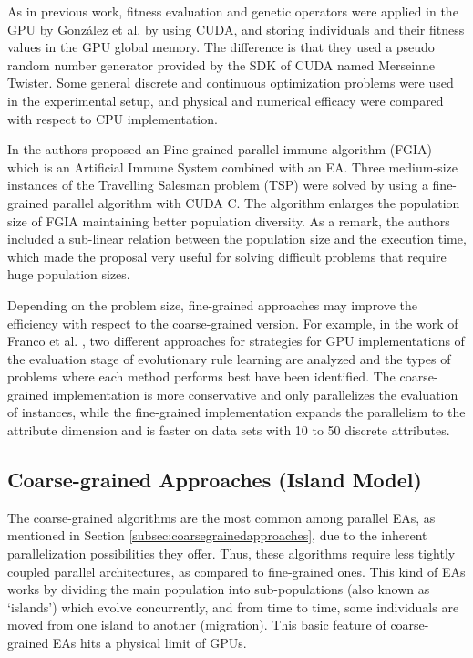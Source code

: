 \documentclass{article}
\begin{document}
As in previous work, fitness evaluation and genetic operators were applied in the GPU by Gonz\'alez et al. \cite{springerlink:10.1007978-3-642-12538-619} by using CUDA, and storing individuals and their fitness values in the GPU global memory. 
The difference is that they used a pseudo random number generator provided by the SDK of CUDA named Merseinne Twister. Some general discrete and continuous optimization problems were used in the experimental setup, and physical and numerical efficacy were compared with respect to CPU implementation. 

In \cite{Li:2009:PIA:1726585.1726930} the authors proposed an Fine-grained parallel immune algorithm (FGIA) which is an Artificial Immune System combined with an EA. Three medium-size instances of the Travelling Salesman problem (TSP) were solved by using a fine-grained parallel algorithm with CUDA C. The algorithm enlarges the population size of FGIA maintaining better population diversity. As a remark, the authors included a sub-linear relation between the population size and the execution time, which made the proposal very useful for solving difficult problems that require huge population sizes.



Depending on the problem size, fine-grained approaches may improve the
efficiency with respect to the coarse-grained version. For example, in
the work of Franco et al. \cite{Franco15LargeScale}, two different
approaches for strategies for GPU implementations of the evaluation
stage of evolutionary rule learning are analyzed and the types of
problems where each method performs best have been identified. The
coarse-grained implementation is more conservative and only
parallelizes the evaluation of instances, while the fine-grained
implementation expands the parallelism to the attribute dimension and
is faster on data sets with 10 to 50 discrete attributes. 


\subsection{Coarse-grained Approaches (Island Model)} 

The coarse-grained algorithms are the most common among parallel EAs, as mentioned in Section \ref{subsec:coarsegrainedapproaches}, due to the inherent parallelization possibilities they offer. Thus, these algorithms require less tightly coupled parallel architectures, as compared to fine-grained ones. 
This kind of EAs works by dividing the main population into sub-populations (also known as `islands') which evolve concurrently, and from time to time, some individuals are moved from one island to another (migration). 
This basic feature of coarse-grained EAs hits a physical limit of
GPUs.  
\end{document}

